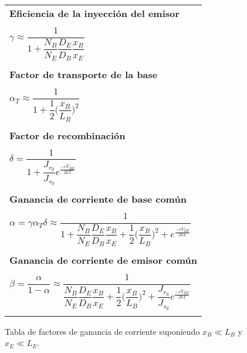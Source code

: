 \documentclass[12pt,a4paper]{article}
\begin{document}
\begin{figure}[ht!]
\begin{center}
\begin{tabular}{|l|} \hline
\textbf{Eficiencia de la inyección del emisor} \\ \\ $\gamma \approx \dfrac{1}{1+\dfrac{N_{B}}{N_{E}} \dfrac{D_{E}}{D_{B}} \dfrac{x_{B}}{x_{E}}}$ \\ \\ \hline
\textbf{Factor de transporte de la base} \\ \\ $\alpha _{T} \approx \dfrac{1}{1+\dfrac{1}{2} \bigg( \dfrac{x_{B}}{L_{B}} \bigg)^{2}} $ \\ \\ \hline
\textbf{Factor de recombinación} \\ \\ $\delta = \dfrac{1}{1+\dfrac{J_{r_{0}}}{J_{s_{0}}} e^{\frac{-eV_{BE}}{2kT}}} $ \\ \\ \hline
\textbf{Ganancia de corriente de base común} \\ \\ $\alpha=\gamma \alpha _{T} \delta \approx \dfrac{1}{1+\dfrac{N_{B}}{N_{E}} \dfrac{D_{E}}{D_{B}} \dfrac{x_{B}}{x_{E}} + \dfrac{1}{2} \bigg( \dfrac{x_{B}}{L_{B}} \bigg)^{2} + e^{\frac{-eV_{BE}}{2kT}}}$ \\ \\ \hline
\textbf{Ganancia de corriente de emisor común} \\ \\ $\beta=\dfrac{\alpha}{1-\alpha} \approx \dfrac{1}{\dfrac{N_{B}}{N_{E}} \dfrac{D_{E}}{D_{B}} \dfrac{x_{B}}{x_{E}} + \dfrac{1}{2} \bigg( \dfrac{x_{B}}{L_{B}} \bigg)^{2} + \dfrac{J_{r_{0}}}{J_{s_{0}}} e^{\frac{-eV_{BE}}{2kT}}}$ \\ \\ \hline
\end{tabular}
\caption{Tabla de factores de ganancia de corriente suponiendo $x_{B} \ll L_{B}$ y $x_{E} \ll L_{E}$.}
\end{center}
\end{figure}
\end{document}
